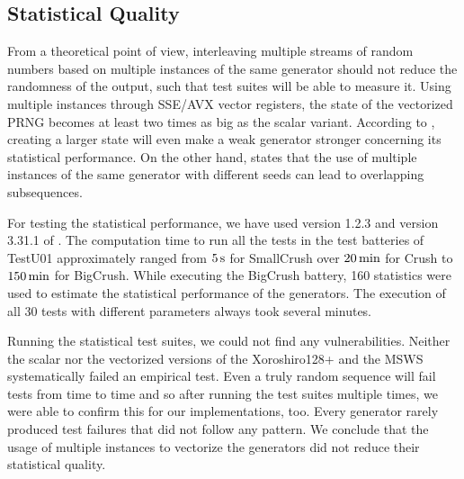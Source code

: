 \documentclass{stdlocal}
\begin{document}
  \subsection{Statistical Quality} %
  \label{sub:statistical_quality}
    From a theoretical point of view, interleaving multiple streams of random numbers based on multiple instances of the same generator should not reduce the randomness of the output, such that test suites will be able to measure it.
    Using multiple instances through SSE/AVX vector registers, the state of the vectorized PRNG becomes at least two times as big as the scalar variant.
    According to \textcite{oneill-blog-toobig}, creating a larger state will even make a weak generator stronger concerning its statistical performance.
    On the other hand, \textcite{fog2015} states that the use of multiple instances of the same generator with different seeds can lead to overlapping subsequences.

    For testing the statistical performance, we have used  version 1.2.3 and version 3.31.1 of .
    The computation time to run all the tests in the test batteries of TestU01 approximately ranged from $5\, \mathrm{s}$ for SmallCrush over $20\, \mathrm{min}$ for Crush to $150\, \mathrm{min}$ for BigCrush.
    While executing the BigCrush battery, 160 statistics were used to estimate the statistical performance of the generators.
    The execution of all 30  tests with different parameters always took several minutes.

    Running the statistical test suites, we could not find any vulnerabilities.
    Neither the scalar nor the vectorized versions of the Xoroshiro128+ and the MSWS systematically failed an empirical test.
    Even a truly random sequence will fail tests from time to time \autocite[\pno~142]{kneusel2018} and so after running the test suites multiple times, we were able to confirm this for our implementations, too.
    Every generator rarely produced test failures that did not follow any pattern.
    We conclude that the usage of multiple instances to vectorize the generators did not reduce their statistical quality.
\end{document}
